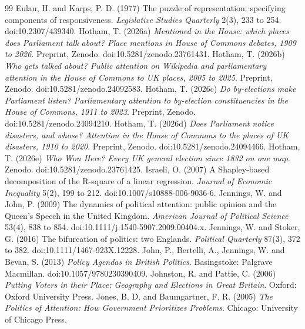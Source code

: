 \documentclass[11pt,a4paper]{article}
\begin{document}
\begin{thebibliography}{99}
 Eulau, H. and Karps, P. D. (1977) The puzzle of representation: specifying components of responsiveness. \textit{Legislative Studies Quarterly} 2(3), 233 to 254. doi:10.2307/439340.
 Hotham, T. (2026a) \textit{Mentioned in the House: which places does Parliament talk about? Place mentions in House of Commons debates, 1909 to 2026}. Preprint, Zenodo. doi:10.5281/zenodo.23761431.
 Hotham, T. (2026b) \textit{Who gets talked about? Public attention on Wikipedia and parliamentary attention in the House of Commons to UK places, 2005 to 2025}. Preprint, Zenodo. doi:10.5281/zenodo.24092583.
 Hotham, T. (2026c) \textit{Do by-elections make Parliament listen? Parliamentary attention to by-election constituencies in the House of Commons, 1911 to 2023}. Preprint, Zenodo. doi:10.5281/zenodo.24094210.
 Hotham, T. (2026d) \textit{Does Parliament notice disasters, and whose? Attention in the House of Commons to the places of UK disasters, 1910 to 2020}. Preprint, Zenodo. doi:10.5281/zenodo.24094466.
 Hotham, T. (2026e) \textit{Who Won Here? Every UK general election since 1832 on one map}. Zenodo. doi:10.5281/zenodo.23761425.
 Israeli, O. (2007) A Shapley-based decomposition of the R-square of a linear regression. \textit{Journal of Economic Inequality} 5(2), 199 to 212. doi:10.1007/s10888-006-9036-6.
 Jennings, W. and John, P. (2009) The dynamics of political attention: public opinion and the Queen's Speech in the United Kingdom. \textit{American Journal of Political Science} 53(4), 838 to 854. doi:10.1111/j.1540-5907.2009.00404.x.
 Jennings, W. and Stoker, G. (2016) The bifurcation of politics: two Englands. \textit{Political Quarterly} 87(3), 372 to 382. doi:10.1111/1467-923X.12228.
 John, P., Bertelli, A., Jennings, W. and Bevan, S. (2013) \textit{Policy Agendas in British Politics}. Basingstoke: Palgrave Macmillan. doi:10.1057/9780230390409.
 Johnston, R. and Pattie, C. (2006) \textit{Putting Voters in their Place: Geography and Elections in Great Britain}. Oxford: Oxford University Press.
 Jones, B. D. and Baumgartner, F. R. (2005) \textit{The Politics of Attention: How Government Prioritizes Problems}. Chicago: University of Chicago Press.

\end{thebibliography}
\end{document}
